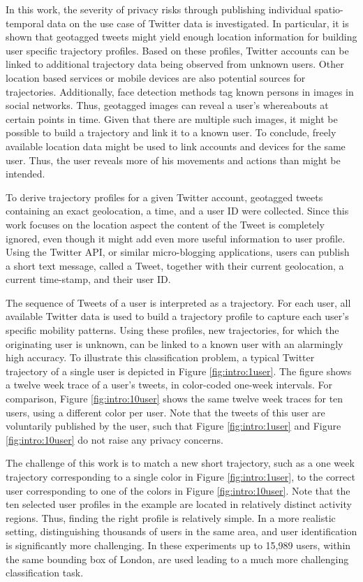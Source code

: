 In this work, the severity of privacy risks through publishing individual spatio-temporal data on the use case of Twitter data is investigated. In particular, it is shown that geotagged tweets might yield enough location information for building user specific trajectory profiles. Based on these profiles, Twitter accounts can be linked to additional trajectory data being observed from unknown users. Other location based services or mobile devices are also potential sources for trajectories. Additionally, face detection methods tag known persons in images in social networks. Thus, geotagged images can reveal a user's whereabouts at certain points in time. Given that there are multiple such images, it might be possible to build a trajectory and link it to a known user. To conclude, freely available location data might be used to link accounts and devices for the same user. Thus, the user reveals more of his movements and actions than might be intended.

To derive trajectory profiles for a given Twitter account, geotagged tweets containing an exact geolocation, a time, and a user ID were collected. Since this work focuses on the location aspect the content of the Tweet is completely ignored, even though it might add even more useful information to user profile. Using the Twitter API, or similar micro-blogging applications, users can publish a short text message, called a Tweet, together with their current geolocation, a current time-stamp, and their user ID.

The sequence of Tweets of a user is interpreted as a trajectory. For each user, all available Twitter data is used to build a trajectory profile to capture each user's specific mobility patterns. Using these profiles, new trajectories, for which the originating user is unknown, can be linked to a known user with an alarmingly high accuracy. To illustrate this classification problem, a typical Twitter trajectory of a single user is depicted in Figure \ref{fig:intro:1user}. The figure shows a twelve week trace of a user's tweets, in color-coded one-week intervals. For comparison, Figure \ref{fig:intro:10user} shows the same twelve week traces for ten users, using a different color per user. Note that the tweets of this user are voluntarily published by the user, such that Figure \ref{fig:intro:1user} and Figure \ref{fig:intro:10user} do not raise any privacy concerns.

The challenge of this work is to match a new short trajectory, such as a one week trajectory corresponding to a single color in Figure \ref{fig:intro:1user}, to the correct user corresponding to one of the colors in Figure \ref{fig:intro:10user}. Note that the ten selected user profiles in the example are located in  relatively distinct activity regions. Thus, finding the right profile is relatively simple. In a more realistic setting, distinguishing thousands of users in the same area, and user identification is significantly more challenging. In these experiments up to 15,989 users, within the same bounding box of London, are used leading to a much more challenging classification task.

